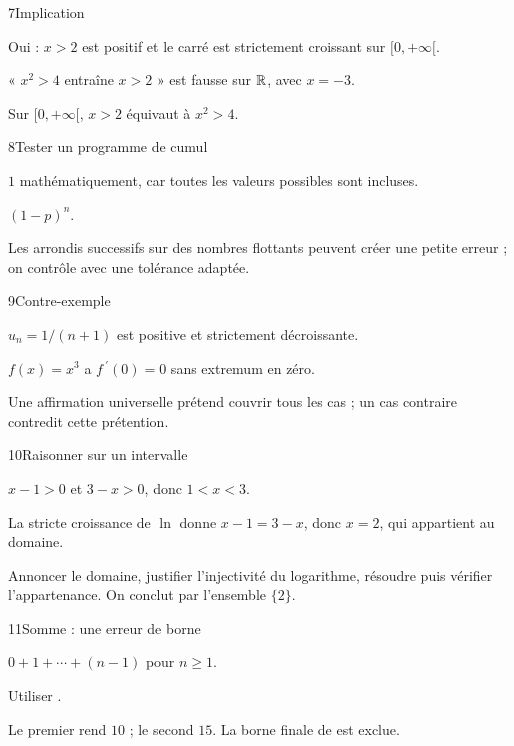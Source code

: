 \begin{corrige}{7}{Implication}
\begin{questions}
\item Oui : $x>2$ est positif et le carré est strictement croissant sur $[0,+\infty[$.
\item « $x^2>4$ entraîne $x>2$ » est fausse sur $\mathbb{R}$, avec $x=-3$.
\item Sur $[0,+\infty[$, $x>2$ équivaut à $x^2>4$.
\end{questions}
\end{corrige}
\begin{corrige}{8}{Tester un programme de cumul}
\begin{questions}
\item $1$ mathématiquement, car toutes les valeurs possibles sont incluses.
\item $(1-p)^n$.
\item Les arrondis successifs sur des nombres flottants peuvent créer une petite erreur ; on contrôle avec une tolérance adaptée.
\end{questions}
\end{corrige}
\begin{corrige}{9}{Contre-exemple}
\begin{questions}
\item $u_n=1/(n+1)$ est positive et strictement décroissante.
\item $f(x)=x^3$ a $f\,\!^{\prime}(0)=0$ sans extremum en zéro.
\item Une affirmation universelle prétend couvrir tous les cas ; un cas contraire contredit cette prétention.
\end{questions}
\end{corrige}
\begin{corrige}{10}{Raisonner sur un intervalle}
\begin{questions}
\item $x-1>0$ et $3-x>0$, donc $1<x<3$.
\item La stricte croissance de $\ln$ donne $x-1=3-x$, donc $x=2$, qui appartient au domaine.
\item Annoncer le domaine, justifier l’injectivité du logarithme, résoudre puis vérifier l’appartenance. On conclut par l’ensemble $\{2\}$.
\end{questions}
\end{corrige}
\begin{corrige}{11}{Somme : une erreur de borne}
\begin{questions}
\item $0+1+\cdots+(n-1)$ pour $n\geq1$.
\item Utiliser .
\item Le premier rend $10$ ; le second $15$. La borne finale de  est exclue.
\end{questions}
\end{corrige}
